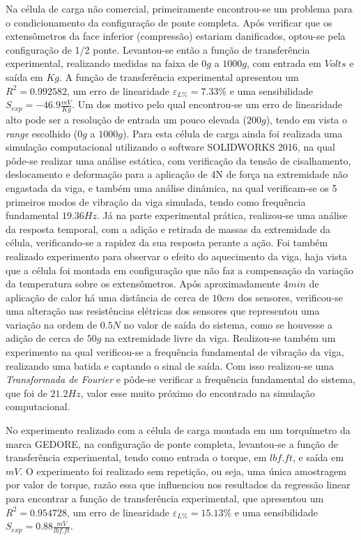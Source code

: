 \documentclass[a4paper]{instrumentacao}
\begin{document}
Na célula de carga não comercial, primeiramente encontrou-se um problema para o condicionamento da configuração de ponte completa. Após verificar que os extensômetros da face inferior (compressão) estariam danificados, optou-se pela configuração de 1/2 ponte. Levantou-se então a função de transferência experimental, realizando medidas na faixa de $0g$ a $1000g$, com entrada em $Volts$ e saída em $Kg$. A função de transferência experimental apresentou um $R^2=0.992582$, um erro de linearidade $\varepsilon_{L\%}=7.33\%$ e uma sensibilidade $S_{exp}=-46.9\frac{mV}{Kg}$. Um dos motivo pelo qual encontrou-se um erro de linearidade alto pode ser a resolução de entrada um pouco elevada ($200g$), tendo em vista o \textit{range} escolhido ($0g$ a $1000g$). Para esta célula de carga ainda foi realizada uma simulação computacional utilizando o software SOLIDWORKS 2016, na qual pôde-se realizar uma análise estática, com verificação da tensão de cisalhamento, deslocamento e deformação para a aplicação de 4N de força na extremidade não engastada da viga, e também uma análise dinâmica, na qual verificam-se os 5 primeiros modos de vibração da viga simulada, tendo como frequência fundamental $19.36Hz$. Já na parte experimental prática, realizou-se uma análise da resposta temporal, com a adição e retirada de massas da extremidade da célula, verificando-se a rapidez da sua resposta perante a ação. Foi também realizado experimento para observar o efeito do aquecimento da viga, haja vista que a célula foi montada em configuração que não faz a compensação da variação da temperatura sobre os extensômetros. Após aproximadamente $4min$ de aplicação de calor há uma distância de cerca de $10cm$ dos sensores, verificou-se uma alteração nas resistências elétricas dos sensores que representou uma variação na ordem de $0.5N$ no valor de saída do sistema, como se houvesse a adição de cerca de $50g$ na extremidade livre da viga. Realizou-se também um experimento na qual verificou-se a frequência fundamental de vibração da viga, realizando uma batida e captando o sinal de saída. Com isso realizou-se uma \textit{Transformada de Fourier} e pôde-se verificar a frequência fundamental do sistema, que foi de $21.2Hz$, valor esse muito próximo do encontrado na simulação computacional.

No experimento realizado com a célula de carga montada em um torquímetro da marca GEDORE, na configuração de ponte completa, levantou-se a função de transferência experimental, tendo como entrada o torque, em $lbf.ft$, e saída em $mV$. O experimento foi realizado sem repetição, ou seja, uma única amostragem por valor de torque, razão essa que influenciou nos resultados da regressão linear para encontrar a função de transferência experimental, que apresentou um $R^2=0.954728$, um erro de linearidade $\varepsilon_{L\%}=15.13\%$ e uma sensibilidade $S_{exp}=0.88\frac{mV}{lbf.ft}$.
\end{document}
